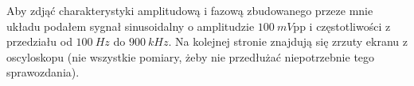 \documentclass[14pt, table]{extarticle}
\begin{document}
\begin{figure}[H]
    \centering
\end{figure}

\newpage
Aby zdjąć charakterystyki amplitudową i fazową zbudowanego przeze mnie układu podałem sygnał sinusoidalny o amplitudzie $100 \ mV$pp i częstotliwości z przedziału od $100 \ Hz$ do $900 \ kHz$. Na kolejnej stronie znajdują się zrzuty ekranu z oscyloskopu (nie wszystkie pomiary, żeby nie przedłużać niepotrzebnie tego sprawozdania).
\end{document}
